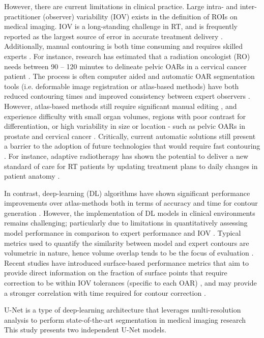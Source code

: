 However, there are current limitations in clinical practice. Large intra- and inter-practitioner (observer) variability (IOV) exists in the definition of ROIs on medical imaging. IOV is a long-standing challenge in RT, and is frequently reported as the largest source of error in accurate treatment delivery \cite{Vinod_2016, tg100}.
Additionally, manual contouring is both time consuming and requires skilled experts \cite{Nikolov_2018}. For instance, research has estimated that a radiation oncologist (RO) needs between 90 -- 120 minutes to delineate pelvic OARs in a cervical cancer patient \cite{Liu_2020}. The process is often computer aided and automatic OAR segmentation tools (i.e. deformable image registration or atlas-based methods) have both reduced contouring times and improved consistency between expert observers \cite{Vinod_2016}. However, atlas-based methods still require significant manual editing \cite{Nikolov_2018}, and experience difficulty with small organ volumes, regions with poor contrast for differentiation, or high variability in size or location - such as pelvic OARs in prostate and cervical cancer \cite{Schreier_2020, Liu_2020}. Critically, current automatic solutions still present a barrier to the adoption of future technologies that would require fast contouring \cite{Nikolov_2018}. For instance, adaptive radiotherapy has shown the potential to deliver a new standard of care for RT patients by updating treatment plans to daily changes in patient anatomy \cite{Nikolov_2018}. 

In contrast, deep-learning (DL) algorithms have shown significant performance improvements over atlas-methods both in terms of accuracy and time for contour generation \cite{Liu_2020}. However, the implementation of DL models in clinical environments remains challenging; particularly due to limitations in quantitatively assessing model performance in comparison to expert performance and IOV \cite{Nikolov_2018}. Typical metrics used to quantify the similarity between model and expert contours are volumetric in nature, hence volume overlap tends to be the focus of evaluation \cite{Nikolov_2018}. Recent studies have introduced surface-based performance metrics that aim to provide direct information on the fraction of surface points that require correction to be within IOV tolerances (specific to each OAR) \cite{Nikolov_2018, Vaassen_2020}, and may provide a stronger correlation with time required for contour correction \cite{Vaassen_2020}.

U-Net is a type of deep-learning architecture that leverages multi-resolution analysis to perform state-of-the-art segmentation in medical imaging research \cite{Kazemifar_2018, Zhu_2018} This study presents two independent U-Net models.

